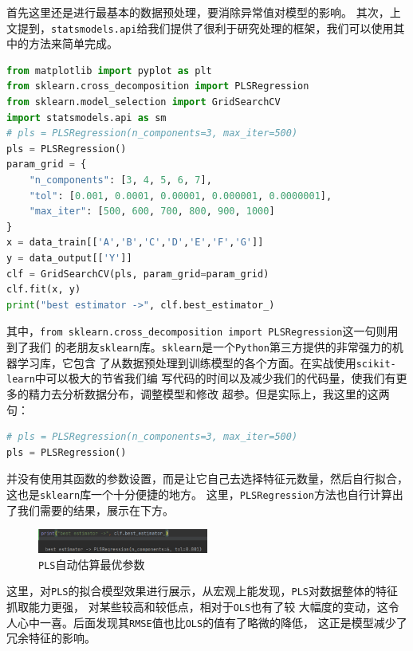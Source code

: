 \documentclass[11pt,a4paper]{elegantpaper}
\begin{document}
\begin{multicols}{2}
首先这里还是进行最基本的数据预处理，要消除异常值对模型的影响。
其次，上文提到，\lstinline{statsmodels.api}给我们提供了很利于研究处理的框架，我们可以使用其中的方法来简单完成。


\begin{lstlisting}[language=Python]
from matplotlib import pyplot as plt
from sklearn.cross_decomposition import PLSRegression
from sklearn.model_selection import GridSearchCV
import statsmodels.api as sm
# pls = PLSRegression(n_components=3, max_iter=500)
pls = PLSRegression()
param_grid = {
    "n_components": [3, 4, 5, 6, 7],
    "tol": [0.001, 0.0001, 0.00001, 0.000001, 0.0000001],
    "max_iter": [500, 600, 700, 800, 900, 1000]
}
x = data_train[['A','B','C','D','E','F','G']]
y = data_output[['Y']]
clf = GridSearchCV(pls, param_grid=param_grid)
clf.fit(x, y)
print("best estimator ->", clf.best_estimator_)
\end{lstlisting}

其中，\lstinline{from sklearn.cross_decomposition import PLSRegression}这一句则用到了我们
的老朋友\lstinline{sklearn}库。\lstinline{sklearn}是一个\lstinline{Python}第三方提供的非常强力的机器学习库，它包含
了从数据预处理到训练模型的各个方面。在实战使用\lstinline{scikit-learn}中可以极大的节省我们编
写代码的时间以及减少我们的代码量，使我们有更多的精力去分析数据分布，调整模型和修改
超参。但是实际上，我这里的这两句：

\begin{lstlisting}[language=Python]
# pls = PLSRegression(n_components=3, max_iter=500)
pls = PLSRegression()
\end{lstlisting}

并没有使用其函数的参数设置，而是让它自己去选择特征元数量，然后自行拟合，这也是\lstinline{sklearn}库一个十分便捷的地方。
这里，\lstinline{PLSRegression}方法也自行计算出了我们需要的结果，展示在下方。

\begin{figure}[H]
  \centering
  \includegraphics[width=0.5\textwidth]{images/PP.png}
  \caption{\lstinline{PLS}自动估算最优参数} 
\end{figure}

这里，对\lstinline{PLS}的拟合模型效果进行展示，从宏观上能发现，\lstinline{PLS}对数据整体的特征抓取能力更强，
对某些较高和较低点，相对于\lstinline{OLS}也有了较
大幅度的变动，这令人心中一喜。后面发现其\lstinline{RMSE}值也比\lstinline{OLS}的值有了略微的降低，
这正是模型减少了冗余特征的影响。


\end{multicols}
\end{document}
